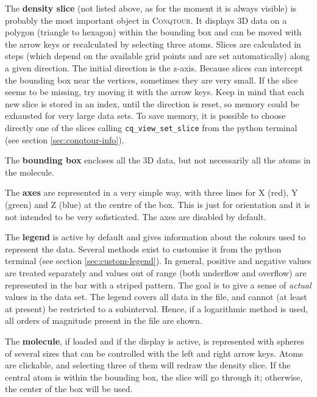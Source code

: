 \documentclass[a4paper,notitlepage,11pt]{article}
\def\Conqtour{\textsc{Conqtour}}
\begin{document}
The {\bf density slice} (not listed above, as for the moment it is always visible) 
is probably the most important object in \Conqtour.
It displays 3D data on a polygon (triangle to hexagon) within the bounding box
and can be moved with the arrow keys or 
recalculated by selecting three atoms. Slices are calculated in steps 
(which depend on the available grid points and are set automatically) along a
given direction. The initial direction is the z-axis. Because slices can intercept
the bounding box near the vertices, sometimes they are very small. If the slice
seems to be missing, try moving it with the arrow keys. Keep in mind that each new
slice is stored in an index, until the direction is reset, so memory could be exhausted
for very large data sets. To save memory, it is possible to choose directly one of the slices calling 
\texttt{cq\_view\_set\_slice} from the python terminal (see section \ref{sec:conqtour-info}).

The {\bf bounding box} encloses all the 3D data, but not necessarily all the atoms in the molecule.

The {\bf axes} are represented in a very simple way, with three lines for X (red), Y (green) and Z (blue) at the 
centre of the box. This is just for orientation and it is not intended to be very sofisticated. The axes are disabled
by default.

The {\bf legend} is active by default and gives information about the colours used to represent the data.
Several methods exist to customise it from the python terminal (see section \ref{sec:custom-legend}). In general, 
positive and negative values are treated separately and values out of range (both underflow and overflow) 
are represented in the bar with a striped pattern. The goal is to give a sense of \emph{actual} values in the data set.
The legend covers all data in the file, and cannot (at least at present) be restricted to a subinterval. Hence, if a
logarithmic method is used, all orders of magnitude present in the file are shown.

The {\bf molecule}, if loaded and if the display is active, is represented with spheres of several sizes that 
can be controlled with the left and right arrow keys. Atoms are clickable, and selecting three of them 
will redraw the density slice. If the central atom is within the bounding box, the
slice will go through it; otherwise, the center of the box will be used.
\end{document}
